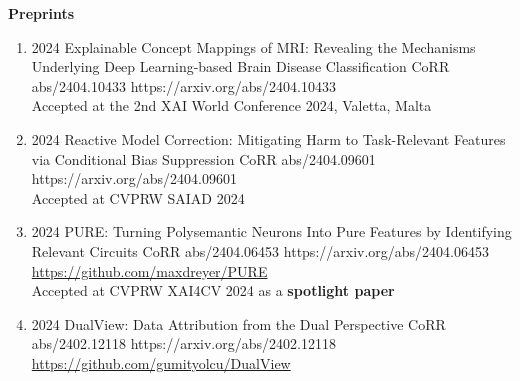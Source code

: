 \headedsection %
{\bf Preprints}{}
{
    \begin{enumerate}

        \item {}
                        {2024}
                        {Explainable Concept Mappings of MRI: Revealing the Mechanisms Underlying Deep Learning-based Brain Disease Classification}
                        {CoRR abs/2404.10433}
                        {https://arxiv.org/abs/2404.10433}
                        {\\ Accepted at the 2nd XAI World Conference 2024, Valetta, Malta}


        \item {}
                        {2024}
                        {Reactive Model Correction: Mitigating Harm to Task-Relevant Features via Conditional Bias Suppression}
                        {CoRR abs/2404.09601}
                        {https://arxiv.org/abs/2404.09601}
                        {\\ Accepted at CVPRW SAIAD 2024}

        \item {}
                        {2024}
                        {PURE: Turning Polysemantic Neurons Into Pure Features by Identifying Relevant Circuits}
                        {CoRR abs/2404.06453}
                        {https://arxiv.org/abs/2404.06453}
                        {\\\href{https://github.com/maxdreyer/PURE}{https://github.com/maxdreyer/PURE}\\
                        Accepted at CVPRW XAI4CV 2024 as a \textbf{spotlight paper}}

        \item {}
                        {2024}
                        {DualView: Data Attribution from the Dual Perspective}
                        {CoRR abs/2402.12118}
                        {https://arxiv.org/abs/2402.12118}
                        {\\\href{https://github.com/gumityolcu/DualView}{https://github.com/gumityolcu/DualView}}


\end{enumerate}}

